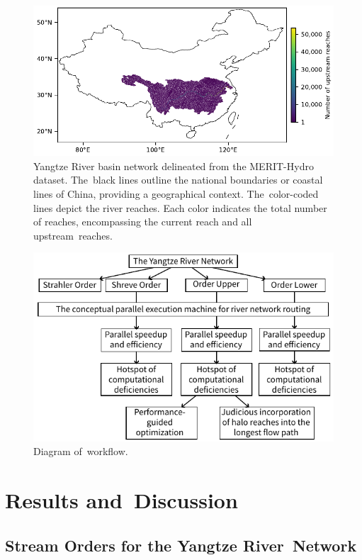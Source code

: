 \documentclass[water,article,accept,pdftex,moreauthors]{Definitions/mdpi}
\begin{document}
\begin{figure}[H]
    \includegraphics[width=13.5 cm]{fig/domain.pdf}
    \caption{Yangtze River basin network delineated from the MERIT-Hydro dataset. The~black lines outline the national boundaries or coastal lines of China, providing a geographical context. The~color-coded lines depict the river reaches. Each color indicates the total number of reaches, encompassing the current reach and all upstream~reaches. \label{fig:domain}}
\end{figure}
\vspace{-9pt}
\begin{figure}[H]
    \includegraphics[width=11 cm]{fig/workflow.pdf}
    \caption{Diagram of~workflow. \label{fig:workflow}}
\end{figure}
\unskip

\section{Results and~Discussion}
\label{sec:results}
\unskip

\subsection{Stream Orders for the Yangtze River~Network}
\label{sec:stream_order_yangtze}
\end{document}

